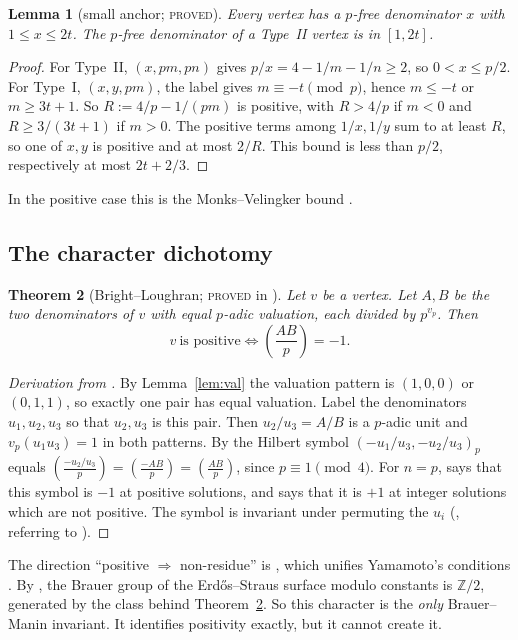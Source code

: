 \documentclass[11pt,reqno]{amsart}
\newtheorem{theorem}{Theorem}[section]
\newtheorem{lemma}[theorem]{Lemma}
\theoremstyle{definition}
\newcommand{\Z}{\mathbb Z}
\newcommand{\leg}[2]{\left(\frac{#1}{#2}\right)}
\newcommand{\status}[1]{\textsc{#1}}
\begin{document}
\begin{lemma}[small anchor; \status{proved}]\label{lem:anchor}
Every vertex has a $p$-free denominator $x$ with $1\le x\le2t$.  The
$p$-free denominator of a Type~II vertex is in $[1,2t]$.
\end{lemma}

\begin{proof}
For Type~II, $(x,pm,pn)$ gives $p/x=4-1/m-1/n\ge2$, so $0<x\le p/2$.  For
Type~I, $(x,y,pm)$, the label gives $m\equiv-t\pmod p$, hence $m\le-t$ or
$m\ge3t+1$.  So $R:=4/p-1/(pm)$ is positive, with $R>4/p$ if $m<0$ and
$R\ge3/(3t+1)$ if $m>0$.  The positive terms among $1/x,1/y$ sum to at
least $R$, so one of $x,y$ is positive and at most $2/R$.  This bound is
less than $p/2$, respectively at most $2t+2/3$.
\end{proof}

In the positive case this is the Monks--Velingker bound
\cite[Thm.~2.1(i)]{MV}.

\subsection{The character dichotomy}

\begin{theorem}[Bright--Loughran; \status{proved} in \cite{BL}]\label{thm:BL}
Let $v$ be a vertex.  Let $A,B$ be the two denominators of $v$ with equal
$p$-adic valuation, each divided by $p^{v_p}$.  Then
\[
 v\ \text{is positive}\iff\leg{AB}{p}=-1 .
\]
\end{theorem}

\begin{proof}[Derivation from \cite{BL}]
By Lemma~\ref{lem:val} the valuation pattern is $(1,0,0)$ or $(0,1,1)$,
so exactly one pair has equal valuation.  Label the denominators
$u_1,u_2,u_3$ so that $u_2,u_3$ is this pair.  Then $u_2/u_3=A/B$ is a
$p$-adic unit and $v_p(u_1u_3)=1$ in both patterns.  By \cite[(3.1),
Lemma~3.4]{BL} the Hilbert symbol $(-u_1/u_3,-u_2/u_3)_p$ equals
$\leg{-u_2/u_3}{p}=\leg{-AB}{p}=\leg{AB}{p}$, since $p\equiv1\pmod4$.  For
$n=p$, \cite[Thm.~1.2]{BL} says that this symbol is $-1$ at positive
solutions, and \cite[Thm.~1.5]{BL} says that it is $+1$ at integer solutions
which are not positive.  The symbol is invariant under permuting the $u_i$
(\cite[\S1]{BL}, referring to \cite[Prop.~2.6]{BL}).
\end{proof}

The direction ``positive $\Rightarrow$ non-residue'' is \cite[Cor.~1.3]{BL},
which unifies Yamamoto's conditions \cite{Yamamoto}.  By \cite[Thm.~1.6]{BL}, the Brauer group of
the Erd\H{o}s--Straus surface modulo constants is $\Z/2$, generated by the
class behind Theorem~\ref{thm:BL}.  So this character is the \emph{only}
Brauer--Manin invariant.  It identifies positivity exactly, but it cannot
create it.
\end{document}
